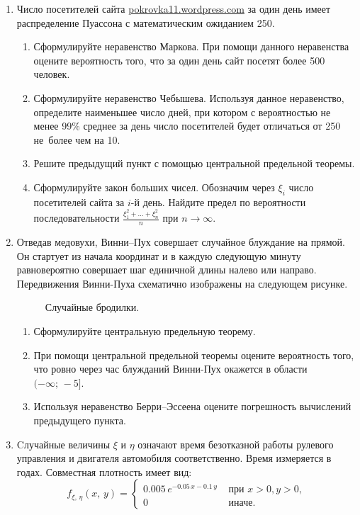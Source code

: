 \begin{enumerate}
\item Число посетителей сайта \url{pokrovka11.wordpress.com} за один день имеет
распределение Пуассона с математическим ожиданием 250.
\begin{enumerate}
  \item Сформулируйте неравенство Маркова. При помощи данного неравенства оцените
  вероятность того, что за один день сайт посетят более 500 человек.
  \item Сформулируйте неравенство Чебышева. Используя данное неравенство, определите
  наименьшее число дней, при котором с вероятностью не менее 99\% среднее за день
  число посетителей будет отличаться от 250 не~более чем на 10.
  \item Решите предыдущий пункт с помощью центральной предельной теоремы.
  \item Сформулируйте закон больших чисел. Обозначим через $\xi_i$ число посетителей
  сайта за $i$-й день. Найдите предел по вероятности последовательности
  $\frac{\xi_1^2 + \ldots + \xi_n^2}{n}$ при $n \rightarrow \infty$.
\end{enumerate}

\item Отведав медовухи, Винни–Пух совершает случайное блуждание на прямой. Он
стартует из начала координат и в каждую следующую минуту равновероятно совершает
шаг единичной длины налево или направо. Передвижения Винни-Пуха схематично
изображены на следующем рисунке.
\begin{figure}[h]
    \noindent{}
    \caption{Случайные бродилки.}
    \label{wun762hkej}
\end{figure}
\begin{enumerate}
  \item Сформулируйте центральную предельную теорему.
  \item При помощи центральной предельной теоремы оцените вероятность того, что
  ровно через час блужданий Винни-Пух окажется в области $(-\infty; \, -5]$.
  \item Используя неравенство Берри–Эссеена оцените погрешность вычислений предыдущего
  пункта.
\end{enumerate}

\item
Cлучайные величины $\xi$ и $\eta$ означают время безотказной работы рулевого
управления и двигателя автомобиля соответственно. Время измеряется в годах.
Совместная плотность имеет вид:
\[
f_{\xi, \,\eta}(x,\,y) =
\begin{cases}
0.005\,e^{-0.05\,x-0.1\,y} & \text{ при } x > 0, y > 0, \\
0                    & \text{ иначе.}
\end{cases}
\]


\end{enumerate}
